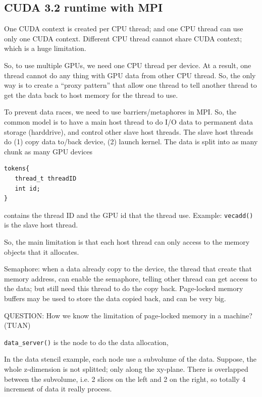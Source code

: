 \subsection{CUDA 3.2 runtime with MPI}
\label{sec:GPUs_cuda32.MPI}

One CUDA context is created per CPU thread; and one CPU thread can use
only one CUDA context. Different CPU thread cannot share CUDA context;
which is a huge limitation.

So, to use multiple GPUs, we need one CPU thread per device. At a
result, one thread cannot do any thing with GPU data from other CPU
thread. So, the only way is to create a ``proxy pattern'' that allow
one thread to tell another thread to get the data back to host memory
for the thread to use. 

To prevent data races, we need to use barriers/metaphores in MPI. So,
the common model is to have a main host thread to do I/O data to
permanent data storage (harddrive), and control other slave host
threads. The slave host threads do (1) copy data to/back device, (2)
launch kernel. The data is split into as many chunk as many GPU devices

\begin{verbatim}
tokens{
   thread_t threadID
   int id;
}
\end{verbatim}
contains the thread ID and the GPU id that the thread use. Example:
\verb!vecadd()! is the slave host thread.

So, the main limitation is that each host thread can only access to
the memory objects that it allocates. 

Semaphore: when a data already copy to the device, the thread that
create that memory address, can enable the semaphore, telling other
thread can get access to the data; but still need this thread to do
the copy back. Page-locked memory buffers may be used to store the
data copied back, and can be very big.

QUESTION: How we know the limitation of page-locked memory in a
machine? (TUAN)




\verb!data_server()! is the node to do the data allocation, 

In the data stencil example, each node use a subvolume of the
data. Suppose, the whole z-dimension is not splitted; only along the
xy-plane. There is overlapped between the subvolume, i.e. 2 slices on
the left and 2 on the right, so totally 4 increment of data it really
process.

